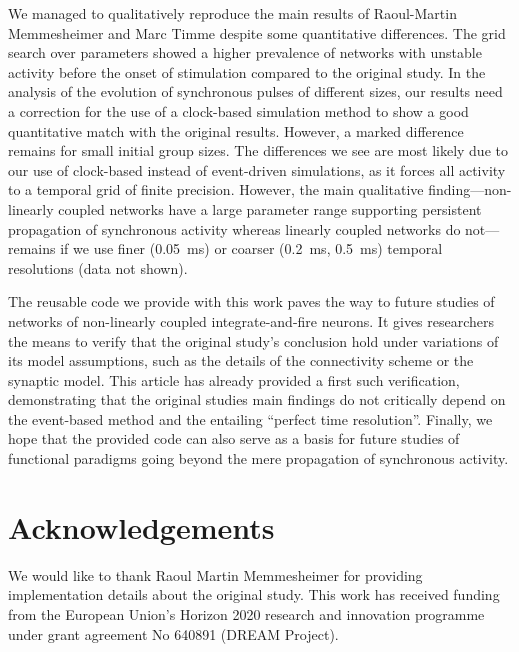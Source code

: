\documentclass[10pt,a4paper,onecolumn]{article}
\begin{document}
We managed to qualitatively reproduce the main results of Raoul-Martin Memmes\-heimer and Marc Timme \cite{Memmesheimer2012} despite some quantitative differences. The grid search over parameters showed a higher prevalence of networks with unstable activity before the onset of stimulation compared to the original study. In the analysis of the evolution of synchronous pulses of different sizes, our results need a correction for the use of a clock-based simulation method to show a good quantitative match with the original results. However, a marked difference remains for small initial group sizes. The differences we see are most likely due to our use of clock-based instead of event-driven simulations, as it forces all activity to a temporal grid of finite precision. However, the main qualitative finding---non-linearly coupled networks have a large parameter range supporting persistent propagation of synchronous activity whereas linearly coupled networks do not---remains if we use finer (\SI{0.05}{\milli\second}) or coarser (\SI{0.2}{\milli\second}, \SI{0.5}{\milli\second}) temporal resolutions (data not shown).

The reusable code we provide with this work paves the way to future studies of networks of non-linearly coupled integrate-and-fire neurons. It gives researchers the means to verify that the original study's conclusion hold under variations of its model assumptions, such as the details of the connectivity scheme or the synaptic model. This article has already provided a first such verification, demonstrating that the original studies main findings do not critically depend on the event-based method and the entailing ``perfect time resolution''. Finally, we hope that the provided code can also serve as a basis for future studies of functional paradigms going beyond the mere propagation of synchronous activity.

\section*{Acknowledgements}
We would like to thank Raoul Martin Memmesheimer for providing implementation details about the original study. This work has received funding from the European Union’s Horizon 2020 research and innovation programme under grant agreement No 640891 (DREAM Project).
\end{document}
